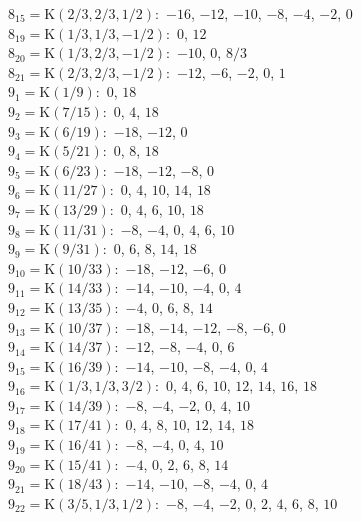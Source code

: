 $8_{15} = \mathrm{K}(2/3, 2/3, 1/2):$  $-16$, $-12$, $-10$, $-8$, $-4$, $-2$, $0$\\ 
$8_{19} = \mathrm{K}(1/3, 1/3, -1/2):$  $0$, $12$\\ 
$8_{20} = \mathrm{K}(1/3, 2/3, -1/2):$  $-10$, $0$, $8/3$\\ 
$8_{21} = \mathrm{K}(2/3, 2/3, -1/2):$  $-12$, $-6$, $-2$, $0$, $1$\\ 
$9_{1} = \mathrm{K}(1/9):$  $0$, $18$\\ 
$9_{2} = \mathrm{K}(7/15):$  $0$, $4$, $18$\\ 
$9_{3} = \mathrm{K}(6/19):$  $-18$, $-12$, $0$\\ 
$9_{4} = \mathrm{K}(5/21):$  $0$, $8$, $18$\\ 
$9_{5} = \mathrm{K}(6/23):$  $-18$, $-12$, $-8$, $0$\\ 
$9_{6} = \mathrm{K}(11/27):$  $0$, $4$, $10$, $14$, $18$\\ 
$9_{7} = \mathrm{K}(13/29):$  $0$, $4$, $6$, $10$, $18$\\ 
$9_{8} = \mathrm{K}(11/31):$  $-8$, $-4$, $0$, $4$, $6$, $10$\\ 
$9_{9} = \mathrm{K}(9/31):$  $0$, $6$, $8$, $14$, $18$\\ 
$9_{10} = \mathrm{K}(10/33):$  $-18$, $-12$, $-6$, $0$\\ 
$9_{11} = \mathrm{K}(14/33):$  $-14$, $-10$, $-4$, $0$, $4$\\ 
$9_{12} = \mathrm{K}(13/35):$  $-4$, $0$, $6$, $8$, $14$\\ 
$9_{13} = \mathrm{K}(10/37):$  $-18$, $-14$, $-12$, $-8$, $-6$, $0$\\ 
$9_{14} = \mathrm{K}(14/37):$  $-12$, $-8$, $-4$, $0$, $6$\\ 
$9_{15} = \mathrm{K}(16/39):$  $-14$, $-10$, $-8$, $-4$, $0$, $4$\\ 
$9_{16} = \mathrm{K}(1/3, 1/3, 3/2):$  $0$, $4$, $6$, $10$, $12$, $14$, $16$, $18$\\ 
$9_{17} = \mathrm{K}(14/39):$  $-8$, $-4$, $-2$, $0$, $4$, $10$\\ 
$9_{18} = \mathrm{K}(17/41):$  $0$, $4$, $8$, $10$, $12$, $14$, $18$\\ 
$9_{19} = \mathrm{K}(16/41):$  $-8$, $-4$, $0$, $4$, $10$\\ 
$9_{20} = \mathrm{K}(15/41):$  $-4$, $0$, $2$, $6$, $8$, $14$\\ 
$9_{21} = \mathrm{K}(18/43):$  $-14$, $-10$, $-8$, $-4$, $0$, $4$\\ 
$9_{22} = \mathrm{K}(3/5, 1/3, 1/2):$  $-8$, $-4$, $-2$, $0$, $2$, $4$, $6$, $8$, $10$\\ 
